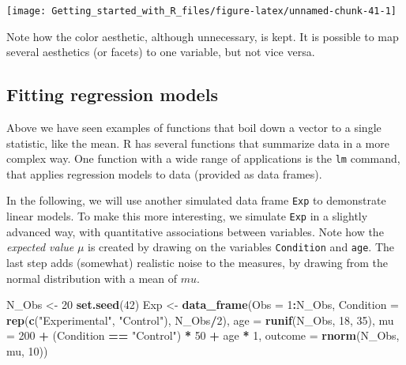 \documentclass[]{svmono}
\newenvironment{Shaded}{\begin{snugshade}}{\end{snugshade}}
\newcommand{\KeywordTok}[1]{\textcolor[rgb]{0.13,0.29,0.53}{\textbf{#1}}}
\newcommand{\DataTypeTok}[1]{\textcolor[rgb]{0.13,0.29,0.53}{#1}}
\newcommand{\DecValTok}[1]{\textcolor[rgb]{0.00,0.00,0.81}{#1}}
\newcommand{\StringTok}[1]{\textcolor[rgb]{0.31,0.60,0.02}{#1}}
\newcommand{\OperatorTok}[1]{\textcolor[rgb]{0.81,0.36,0.00}{\textbf{#1}}}
\newcommand{\NormalTok}[1]{#1}
\begin{document}
\texttt{[image: Getting\_started\_with\_R\_files/figure-latex/unnamed-chunk-41-1]}

Note how the color aesthetic, although unnecessary, is kept. It is
possible to map several aesthetics (or facets) to one variable, but not
vice versa.

\subsection{Fitting regression models}\label{fitting-regression-models}

Above we have seen examples of functions that boil down a vector to a
single statistic, like the mean. R has several functions that summarize
data in a more complex way. One function with a wide range of
applications is the \texttt{lm} command, that applies regression models
to data (provided as data frames).

In the following, we will use another simulated data frame \texttt{Exp}
to demonstrate linear models. To make this more interesting, we simulate
\texttt{Exp} in a slightly advanced way, with quantitative associations
between variables. Note how the \emph{expected value} \(\mu\) is created
by drawing on the variables \texttt{Condition} and \texttt{age}. The
last step adds (somewhat) realistic noise to the measures, by drawing
from the normal distribution with a mean of \(mu\).

\begin{Shaded}
\begin{Highlighting}[]
\NormalTok{N_Obs <-}\StringTok{ }\DecValTok{20}
\KeywordTok{set.seed}\NormalTok{(}\DecValTok{42}\NormalTok{)}
\NormalTok{Exp <-}
\StringTok{  }\KeywordTok{data_frame}\NormalTok{(}\DataTypeTok{Obs =} \DecValTok{1}\OperatorTok{:}\NormalTok{N_Obs,}
             \DataTypeTok{Condition =} \KeywordTok{rep}\NormalTok{(}\KeywordTok{c}\NormalTok{(}\StringTok{"Experimental"}\NormalTok{, }\StringTok{"Control"}\NormalTok{),}
\NormalTok{                             N_Obs}\OperatorTok{/}\DecValTok{2}\NormalTok{),}
             \DataTypeTok{age =} \KeywordTok{runif}\NormalTok{(N_Obs, }\DecValTok{18}\NormalTok{, }\DecValTok{35}\NormalTok{),}
             \DataTypeTok{mu =} \DecValTok{200} \OperatorTok{+}\StringTok{ }\NormalTok{(Condition }\OperatorTok{==}\StringTok{ "Control"}\NormalTok{) }\OperatorTok{*}\StringTok{ }\DecValTok{50} \OperatorTok{+}\StringTok{ }\NormalTok{age }\OperatorTok{*}\StringTok{ }\DecValTok{1}\NormalTok{,}
             \DataTypeTok{outcome =} \KeywordTok{rnorm}\NormalTok{(N_Obs, mu, }\DecValTok{10}\NormalTok{))}
\end{Highlighting}
\end{Shaded}
\end{document}
